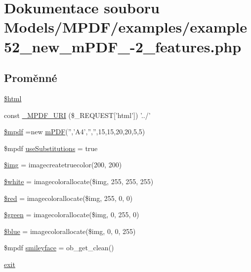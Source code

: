 \hypertarget{example52__new__m_p_d_f__4-2__features_8php}{\section{Dokumentace souboru Models/\-M\-P\-D\-F/examples/example52\-\_\-new\-\_\-m\-P\-D\-F\-\_-\/2\-\_\-features.php}
\label{example52__new__m_p_d_f__4-2__features_8php}
}
\subsection*{Proměnné}
\begin{DoxyCompactItemize}
\item 
\hyperlink{example52__new__m_p_d_f__4-2__features_8php_a6f96e7fc92441776c9d1cd3386663b40}{\$html}
\item 
const \hyperlink{example52__new__m_p_d_f__4-2__features_8php_a3e3768ecaefe46c02ea7e98145b50e3f}{\-\_\-\-M\-P\-D\-F\-\_\-\-U\-R\-I} (\$\-\_\-\-R\-E\-Q\-U\-E\-S\-T\mbox{[}'html'\mbox{]}) '../'
\item 
\hyperlink{example52__new__m_p_d_f__4-2__features_8php_ad028f81910d6cbab9b184d2214b3a8f8}{\$mpdf} =new \hyperlink{classm_p_d_f}{m\-P\-D\-F}('','A4','','',15,15,20,20,5,5)
\item 
\$mpdf \hyperlink{example52__new__m_p_d_f__4-2__features_8php_aa2ce4c2c0ab99d3365e4d7366a9be33a}{use\-Substitutions} = true
\item 
\hyperlink{example52__new__m_p_d_f__4-2__features_8php_a56a9a0da0c26b3d3029cea47a6b9292f}{\$img} = imagecreatetruecolor(200, 200)
\item 
\hyperlink{example52__new__m_p_d_f__4-2__features_8php_af0ce1cc485d1d4ce996297ebe958c238}{\$white} = imagecolorallocate(\$img, 255, 255, 255)
\item 
\hyperlink{example52__new__m_p_d_f__4-2__features_8php_a0c71b871217619e76a5a8d8594d1aff5}{\$red} = imagecolorallocate(\$img, 255, 0, 0)
\item 
\hyperlink{example52__new__m_p_d_f__4-2__features_8php_a3c6d70a77df9a2585942713794a6c3af}{\$green} = imagecolorallocate(\$img, 0, 255, 0)
\item 
\hyperlink{example52__new__m_p_d_f__4-2__features_8php_aac967a3cffede2c1bca951963ec2f65b}{\$blue} = imagecolorallocate(\$img, 0, 0, 255)
\item 
\$mpdf \hyperlink{example52__new__m_p_d_f__4-2__features_8php_ae322569e573ff1e02d1ed1bdd180206a}{smileyface} = ob\-\_\-get\-\_\-clean()
\item 
\hyperlink{example52__new__m_p_d_f__4-2__features_8php_a6733eb5f605d09eaede9845835d71c4e}{exit}
\end{DoxyCompactItemize}


